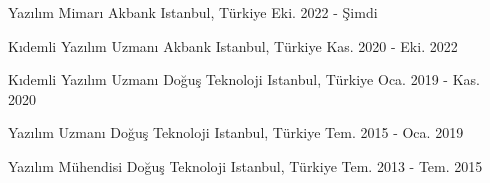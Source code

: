

\begin{cventries}

  \cventry
    {Yazılım Mimarı} %
    {Akbank} %
    {Istanbul, Türkiye} %
    {Eki. 2022 - Şimdi} %
    {}

  \cventry
    {Kıdemli Yazılım Uzmanı} %
    {Akbank} %
    {Istanbul, Türkiye} %
    {Kas. 2020 - Eki. 2022} %
    {}

  \cventry
    {Kıdemli Yazılım Uzmanı} %
    {Doğuş Teknoloji} %
    {Istanbul, Türkiye} %
    {Oca. 2019 - Kas. 2020} %
    {}

  \cventry
    {Yazılım Uzmanı} %
    {Doğuş Teknoloji} %
    {Istanbul, Türkiye} %
    {Tem. 2015 - Oca. 2019} %
    {}

  \cventry
    {Yazılım Mühendisi} %
    {Doğuş Teknoloji} %
    {Istanbul, Türkiye} %
    {Tem. 2013 - Tem. 2015} %
    {}

\end{cventries}
